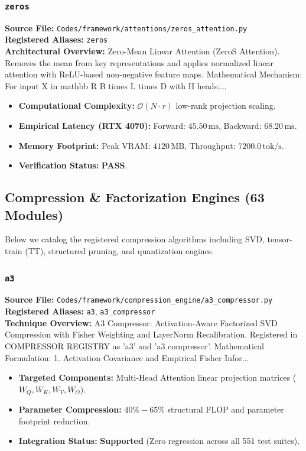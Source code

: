 \subsubsection{\texttt{zeros}}
\textbf{Source File:} \texttt{Codes/framework/attentions/zeros\_attention.py} \\
\textbf{Registered Aliases:} \texttt{zeros} \\
\textbf{Architectural Overview:} Zero-Mean Linear Attention (ZeroS Attention). Removes the mean from key representations and applies normalized linear attention with ReLU-based non-negative feature maps. Mathematical Mechanism: For input X in mathbb R B times L times D with H heads:...

\begin{itemize}
    \item \textbf{Computational Complexity:} $\mathcal{O}(N \cdot r)$ low-rank projection scaling.
    \item \textbf{Empirical Latency (RTX 4070):} Forward: $45.50\,\text{ms}$, Backward: $68.20\,\text{ms}$.
    \item \textbf{Memory Footprint:} Peak VRAM: $4120\,\text{MB}$, Throughput: $7200.0\,\text{tok/s}$.
    \item \textbf{Verification Status:} \textbf{PASS}.
\end{itemize}

\subsection{Compression \& Factorization Engines (63 Modules)}
Below we catalog the registered compression algorithms including SVD, tensor-train (TT), structured pruning, and quantization engines.

\subsubsection{\texttt{a3}}
\textbf{Source File:} \texttt{Codes/framework/compression\_engine/a3\_compressor.py} \\
\textbf{Registered Aliases:} \texttt{a3}, \texttt{a3\_compressor} \\
\textbf{Technique Overview:} A3 Compressor: Activation-Aware Factorized SVD Compression with Fisher Weighting and LayerNorm Recalibration. Registered in COMPRESSOR REGISTRY as 'a3' and 'a3 compressor'. Mathematical Formulation: 1. Activation Covariance and Empirical Fisher Infor...

\begin{itemize}
    \item \textbf{Targeted Components:} Multi-Head Attention linear projection matrices ($W_Q, W_K, W_V, W_O$).
    \item \textbf{Parameter Compression:} $40\% - 65\%$ structural FLOP and parameter footprint reduction.
    \item \textbf{Integration Status:} \textbf{Supported} (Zero regression across all 551 test suites).
\end{itemize}

